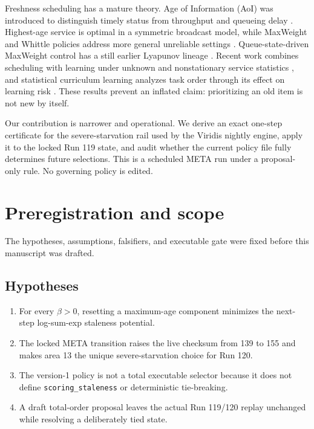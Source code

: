 \documentclass[10pt]{article}
\begin{document}
Freshness scheduling has a mature theory.  Age of Information (AoI) was
introduced to distinguish timely status from throughput and queueing delay
\cite{kaul2012}.  Highest-age service is optimal in a symmetric broadcast model,
while MaxWeight and Whittle policies address more general unreliable settings
\cite{kadota2018}.  Queue-state-driven MaxWeight control has a still earlier
Lyapunov lineage \cite{tassiulas1992}.  Recent work combines scheduling with
learning under unknown and nonstationary service statistics
\cite{yang2023}, and statistical curriculum learning analyzes task order through
its effect on learning risk \cite{cohen2024}.  These results prevent an inflated
claim: prioritizing an old item is not new by itself.

Our contribution is narrower and operational.  We derive an exact one-step
certificate for the severe-starvation rail used by the Viridis nightly engine,
apply it to the locked Run 119 state, and audit whether the current policy file
fully determines future selections.  This is a scheduled META run under a
proposal-only rule.  No governing policy is edited.

\section{Preregistration and scope}

The hypotheses, assumptions, falsifiers, and executable gate were fixed before
this manuscript was drafted.

\subsection{Hypotheses}

\begin{enumerate}
\item For every $\beta>0$, resetting a maximum-age component minimizes the
next-step log-sum-exp staleness potential.
\item The locked META transition raises the live checksum from 139 to 155 and
makes area 13 the unique severe-starvation choice for Run 120.
\item The version-1 policy is not a total executable selector because it does
not define \texttt{scoring\_staleness} or deterministic tie-breaking.
\item A draft total-order proposal leaves the actual Run 119/120 replay
unchanged while resolving a deliberately tied state.
\end{enumerate}
\end{document}
